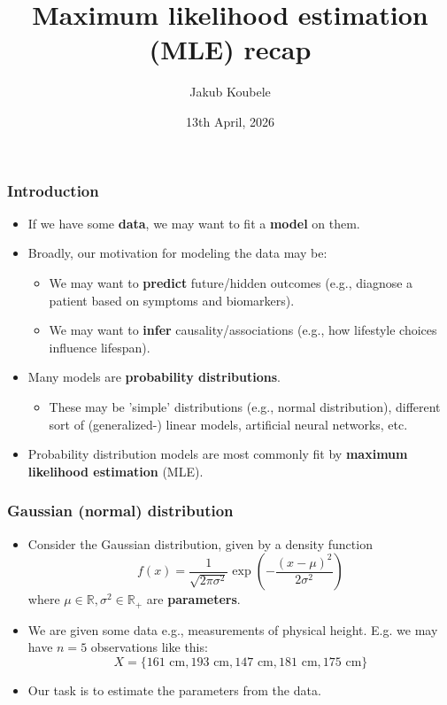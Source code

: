 \documentclass{beamer}
\title{Maximum likelihood estimation (MLE) recap}
\author{Jakub Koubele}
\date{13th April, 2026}
\begin{document}
	\frame{\titlepage}
	
	
	\begin{frame}
		\frametitle{Introduction}	
		\pause		
		\begin{itemize}
		\item If we have some \textbf{data}, we may want to fit a \textbf{model} on them. \pause
		\item Broadly, our motivation for modeling the data may be:
			\begin{itemize}
				\item We may want to \textbf{predict} future/hidden outcomes (e.g., diagnose a patient based on symptoms and biomarkers).
				\item We may want to \textbf{infer} causality/associations (e.g., how lifestyle choices influence lifespan).
			\end{itemize}
			
		\pause
		\item Many models are \textbf{probability distributions}.
		\begin{itemize}
			\item These may be 'simple' distributions (e.g., normal distribution), different sort of (generalized-) linear models, artificial neural networks, etc.
		\end{itemize}
		\pause
		\item Probability distribution models are most commonly fit by \textbf{maximum likelihood estimation} (MLE).
		
		
		\end{itemize}		
	\end{frame}	
	
	
	\begin{frame}
		\frametitle{Gaussian (normal) distribution}
		\begin{itemize}
			\item Consider the Gaussian distribution, given by a density function
			$$
			f(x) = \frac{1}{\sqrt{2 \pi \sigma^2}} \exp \left( - \frac{\left( x-\mu \right)^2 }{2\sigma^2} \right)
			$$
			where $\mu \in \mathbb{R}, \sigma^2 \in \mathbb{R}_+$ are \textbf{parameters}.
			\pause
			\item We are given some data e.g., measurements of physical height. E.g. we may have $n=5$ observations like this:
			$$
			X = \{ 161\text{ cm}, 193\text{ cm}, 147\text{ cm}, 181\text{ cm}, 175\text{ cm}\}
			$$
			\pause
			\item Our task is to estimate the parameters from the data.
			
		\end{itemize}
	\end{frame}	
\end{document}
